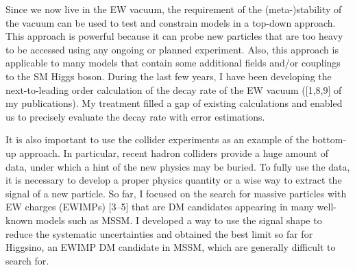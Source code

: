 \documentclass[12pt,notitlepage]{article}
\begin{document}
Since we now live in the EW vacuum, the requirement of the (meta-)stability of the vacuum can be used to test and constrain models in a top-down approach.
This approach is powerful because it can probe new particles that are too heavy to be accessed using any ongoing or planned experiment.
Also, this approach is applicable to many models that contain some additional fields and/or couplings to the SM Higgs boson.
During the last few years, I have been developing the next-to-leading order calculation of the decay rate of the EW vacuum ([1,8,9] of my publications).
My treatment filled a gap of existing calculations and enabled us to precisely evaluate the decay rate with error estimations.

It is also important to use the collider experiments as an example of the bottom-up approach.
In particular, recent hadron colliders provide a huge amount of data, under which a hint of the new physics may be buried.
To fully use the data, it is necessary to develop a proper physics quantity or a wise way to extract the signal of a new particle.
So far, I focused on the search for massive particles with EW charges (EWIMPs) [3--5] that are DM candidates appearing in many well-known models such as MSSM.
I developed a way to use the signal shape to reduce the systematic uncertainties and obtained the best limit so far for Higgsino, an EWIMP DM candidate in MSSM, which are generally difficult to search for.
\end{document}
